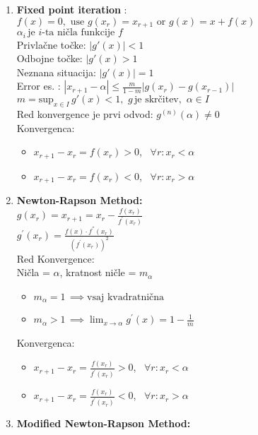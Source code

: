 \documentclass[12pt]{amsart}
\theoremstyle{plain}
\begin{document}
\begin{enumerate}
  \item\textbf{ Fixed point iteration }: \\
  $f(x) = 0, \,\, \text{use}\,\, g(x_r) = x_{r + 1} \,\, \text{or} \,\, g(x) = x + f(x)$  \\
  $ \alpha_i \, \text{je $i$-ta ničla funkcije $f$}$ \\
  Privlačne točke: $ |g'(x)| < 1$ \\
  Odbojne točke: $ |g'(x) > 1$ \\
  Neznana situacija: $ |g'(x)| = 1$ \\
  Error es. : $ | x_{r+1} - \alpha | \leq \frac{m}{1 - m} |g(x_r) - g(x_{r-1})| $ \\
  $m = \text{sup}_{x \in I}\, g'(x) < 1, \,\, g \, \text{je skrčitev}, \, \, \alpha \in I $ \\
  Red konvergence je prvi odvod: $g^{(n)}(\alpha) \neq 0$ \\
  Konvergenca:
  \begin{itemize}
    \item $x_{r+1} - x_r = f(x_r) > 0$, \, $\forall r: x_r < \alpha$ 
    \item $x_{r+1} - x_r = f(x_r) < 0$, \, $\forall r: x_r > \alpha$ 
  \end{itemize}
\item\textbf{ Newton-Rapson Method: } \\
  $ g(x_r) = x_{r+1} = x_r - \frac{f(x_r)}{f^{'}(x_r)} $ \\
  $ g^{'}(x_r) = \frac{f(x) \cdot f^{''}(x_r)}{(f^{'}(x_r))^2} $ \\
  Red Konvergence: \\
  Ničla = $\alpha$, kratnost ničle = $m_{\alpha}$
  \begin{itemize}
    \item $m_{\alpha} = 1 \, \implies \text{vsaj kvadratnična} $
    \item $ m_{\alpha} > 1 \, \implies \lim_{x \to \alpha} g^{'}(x) = 1 - \frac{1}{m}$
  \end{itemize}
  Konvergenca:
  \begin{itemize}
    \item $x_{r+1} - x_r = \frac{f(x_r)}{f^{'}(x_r)} > 0$, \, $\forall r: x_r < \alpha$ 
    \item $x_{r+1} - x_r = \frac{f(x_r)}{f^{'}(x_r)} < 0$, \, $\forall r: x_r > \alpha$ 
  \end{itemize}
  \item\textbf{ Modified Newton-Rapson Method: } \\

\end{enumerate}
\end{document}

